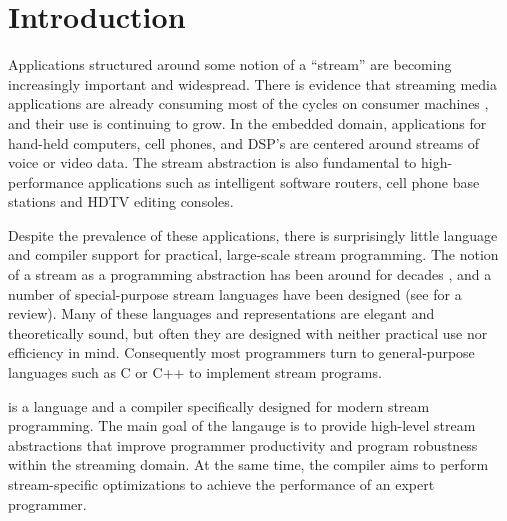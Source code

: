 \section{Introduction}

Applications structured around some notion of a ``stream'' are
becoming increasingly important and widespread. There is evidence
that streaming media applications are already consuming most of
the cycles on consumer machines \cite{Rix98}, and their use is
continuing to grow.  In the embedded domain, applications for
hand-held computers, cell phones, and DSP's are centered around
streams of voice or video data.  The stream abstraction is also
fundamental to high-performance applications such as intelligent
software routers, cell phone base stations and HDTV editing
consoles.

Despite the prevalence of these applications, there is
surprisingly little language and compiler support for practical,
large-scale stream programming.  The notion of a stream as a
programming abstraction has been around for decades \cite{SICP},
and a number of special-purpose stream languages have been
designed (see \cite{survey97} for a review). Many of these
languages and representations are elegant and theoretically sound,
but often they are designed with neither practical use nor
efficiency in mind. Consequently most programmers turn to
general-purpose languages such as C or C++ to implement stream
programs.

\begin{comment}
There are two reasons that general-purpose languages are
inappropriate for stream programming.  Firstly, they are a
mismatch for the application domain.  That is they do not provide
a natural or intuitive representation of streams thereby having a
negative effect on readability, robustness, and programmer
productivity.  Furthermore, general-purpose languages do not
communicate well the inherent parallelism of stream computations.
 Secondly, general-purpose languages are a mismatch for the
emerging class of grid-based architectures
\cite{smartmemories,rawshort,trips}.
\end{comment}

{\StreamIt} is a language and a compiler specifically designed for
modern stream programming.  The main goal of the {\StreamIt}
langauge is to provide high-level stream abstractions that improve
programmer productivity and program robustness within the
streaming domain.  At the same time, the {\StreamIt} compiler aims
to perform stream-specific optimizations to achieve the
performance of an expert programmer.

